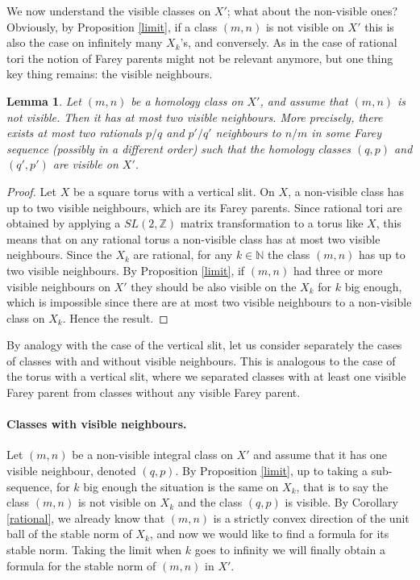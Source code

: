 \documentclass{article}
\newcommand{\NN}{\mathbb{N}}
\newcommand{\ZZ}{\mathbb{Z}}
\newtheorem{lemma}[thm]{Lemma}
\theoremstyle{definition}
\begin{document}
We now understand the visible classes on $X'$; what about the non-visible ones? Obviously, by Proposition \ref{limit}, if a class $(m,n)$ is not visible on $X'$ this is also the case on infinitely many $X_k$'s, and conversely. As in the case of rational tori the notion of Farey parents might not be relevant anymore, but one thing key thing remains: the visible neighbours.

\begin{lemma}
    Let $(m,n)$ be a homology class on $X'$, and assume that $(m,n)$ is not visible. Then it has at most two visible neighbours. More precisely, there exists at most two rationals $p/q$ and $p'/q'$ neighbours to $n/m$ in some Farey sequence (possibly in a different order) such that the homology classes $(q,p)$ and $(q',p')$ are visible on $X'$.
\end{lemma}

\begin{proof}
Let $X$ be a square torus with a vertical slit. On $X$, a non-visible class has up to two visible neighbours, which are its Farey parents. Since rational tori are obtained by applying a $SL(2,\ZZ)$ matrix transformation to a torus like $X$, this means that on any rational torus a non-visible class has at most two visible neighbours. Since the $X_k$ are rational, for any $k\in \NN$ the class $(m,n)$ has up to two visible neighbours. By Proposition \ref{limit}, if $(m,n)$ had three or more visible neighbours on $X'$ they should be also visible on the $X_k$ for $k$ big enough, which is impossible since there are at most two visible neighbours to a non-visible class on $X_k$. Hence the result.
\end{proof}

By analogy with the case of the vertical slit, let us consider separately the cases of classes with and without visible neighbours. This is analogous to the case of the torus with a vertical slit, where we separated classes with at least one visible Farey parent from classes without any visible Farey parent.

\paragraph{Classes with visible neighbours.}

Let $(m,n)$ be a non-visible integral class on $X'$ and assume that it has one visible neighbour, denoted $(q,p)$. By Proposition \ref{limit}, up to taking a sub-sequence, for $k$ big enough the situation is the same on $X_k$, that is to say the class $(m,n)$ is not visible on $X_k$ and the class $(q,p)$ is visible. By Corollary \ref{rational}, we already know that $(m,n)$ is a strictly convex direction of the unit ball of the stable norm of $X_k$, and now we would like to find a formula for its stable norm. Taking the limit when $k$ goes to infinity we will finally obtain a formula for the stable norm of $(m,n)$ in $X'$. \newline
\end{document}
